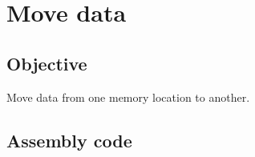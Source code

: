 \section{Move data}

\subsection{Objective}

Move data from one memory location to another.

\subsection{Assembly code}

